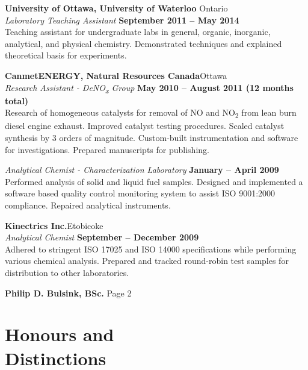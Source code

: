 \documentclass[margin,line]{resume}
\begin{document}
\begin{resume}
    \textbf{University of Ottawa, University of Waterloo} \hfill Ontario \\\vspace{1mm}%
    \textsl{Laboratory Teaching Assistant} \hfill \textbf{September 2011 -- May 2014}\\
    Teaching assistant for undergraduate labs in general, organic, inorganic, analytical, and physical chemistry. Demonstrated techniques and explained theoretical basis for experiments.

    \textbf{CanmetENERGY, Natural Resources Canada}\hfill Ottawa \\\vspace{1mm}%
    \textsl{Research Assistant - DeNO\textsubscript{x} Group} \hfill \textbf{May 2010 -- August 2011 (12 months total)}\\
    Research of homogeneous catalysts for removal of NO and NO\textsubscript{2} from lean burn diesel engine exhaust. Improved catalyst testing procedures. Scaled catalyst synthesis by 3 orders of magnitude. Custom-built instrumentation and software for investigations.  Prepared manuscripts for publishing.

    \textsl{Analytical Chemist - Characterization Laboratory} \hfill \textbf{January -- April 2009}\\
    Performed analysis of solid and liquid fuel samples. Designed and implemented a software based quality control monitoring system to assist ISO 9001:2000 compliance. Repaired analytical instruments.

    \textbf{Kinectrics Inc.}\hfill Etobicoke\\\vspace{1mm}%
    \textsl{Analytical Chemist} \hfill \textbf{September -- December 2009}\\
    Adhered to stringent ISO 17025 and ISO 14000 specifications while performing various chemical analysis. Prepared and tracked round-robin test samples for distribution to other laboratories.

\newpage
	\textbf{Philip D. Bulsink, BSc.} \hspace{279pt} Page 2 \\
	\vspace{-4mm}
    \section{\mysidestyle Honours and\\Distinctions} 


\end{resume}
\end{document}
